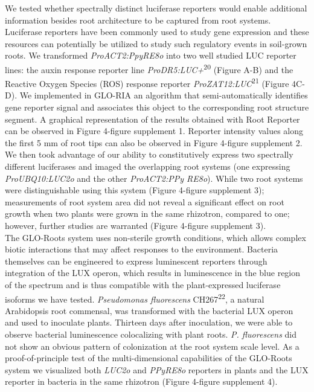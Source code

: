 \documentclass[]{article}
\begin{document}
We tested whether spectrally distinct luciferase reporters would enable
additional information besides root architecture to be captured from
root systems. Luciferase reporters have been commonly used to study gene
expression and these resources can potentially be utilized to study such
regulatory events in soil-grown roots. We transformed
\emph{ProACT2:PpyRE8o} into two well studied LUC reporter lines: the
auxin response reporter line \emph{ProDR5:LUC+}\textsuperscript{20}
(Figure A-B) and the Reactive Oxygen Species (ROS) response reporter
\emph{ProZAT12:LUC}\textsuperscript{21} (Figure 4C-D). We implemented in
GLO-RIA an algorithm that semi-automatically identifies gene reporter
signal and associates this object to the corresponding root structure
segment. A graphical representation of the results obtained with Root
Reporter can be observed in Figure 4-figure supplement 1. Reporter
intensity values along the first 5 mm of root tips can also be observed
in Figure 4-figure supplement 2.\\We then took advantage of our ability
to constitutively express two spectrally different luciferases and
imaged the overlapping root systems (one expressing
\emph{ProUBQ10:LUC2o} and the other \emph{ProACT2:PPy RE8o}). While two
root systems were distinguishable using this system (Figure 4-figure
supplement 3); measurements of root system area did not reveal a
significant effect on root growth when two plants were grown in the same
rhizotron, compared to one; however, further studies are warranted
(Figure 4-figure supplement 3).\\The GLO-Roots system uses non-sterile
growth conditions, which allows complex biotic interactions that may
affect responses to the environment. Bacteria themselves can be
engineered to express luminescent reporters through integration of the
LUX operon, which results in luminescence in the blue region of the
spectrum and is thus compatible with the plant-expressed luciferase
isoforms we have tested. \emph{Pseudomonas fluorescens}
CH267\textsuperscript{22}, a natural Arabidopsis root commensal, was
transformed with the bacterial LUX operon and used to inoculate plants.
Thirteen days after inoculation, we were able to observe bacterial
luminescence colocalizing with plant roots. \emph{P. fluorescens} did
not show an obvious pattern of colonization at the root system scale
level. As a proof-of-principle test of the multi-dimensional
capabilities of the GLO-Roots system we visualized both \emph{LUC2o} and
\emph{PPyRE8o} reporters in plants and the LUX reporter in bacteria in
the same rhizotron (Figure 4-figure supplement 4).
\end{document}

